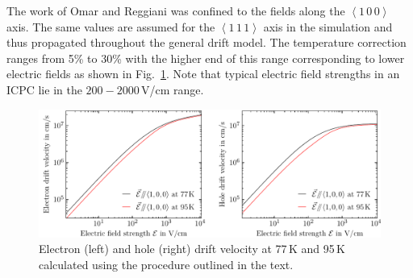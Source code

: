 The work of Omar and Reggiani was confined to the fields along the $\left<1\,0\,0\right>$ axis. The same values are assumed for the $\left<1\,1\,1\right>$ axis in the simulation and thus propagated throughout the general drift model. The temperature correction ranges from 5\% to 30\% with the higher end of this range corresponding to lower electric fields as shown in Fig.~\ref{fig:drift_vel_temp_corr}. Note that typical electric field strengths in an ICPC lie in the $200-2000$\,V/cm range.
\begin{figure}[htb]
    \centering
    \includegraphics[width=6in]{figs/sim/drift_vel_temp_corr.pdf}
    \caption{Electron (left) and hole (right) drift velocity at 77\,K and 95\,K calculated using the procedure outlined in the text.}
    \label{fig:drift_vel_temp_corr}
\end{figure}

